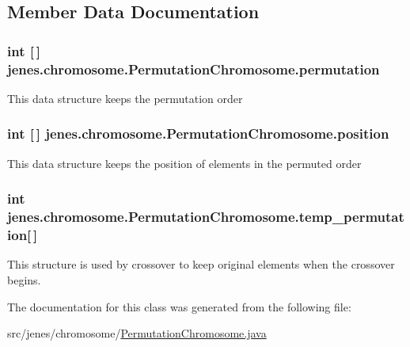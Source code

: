 \subsection{Member Data Documentation}
\hypertarget{classjenes_1_1chromosome_1_1_permutation_chromosome_a8b5701fbbb3cdfef29d346e0375260fc}{
\subsubsection[{permutation}]{\setlength{\rightskip}{0pt plus 5cm}int \mbox{[}$\,$\mbox{]} jenes.\-chromosome.\-Permutation\-Chromosome.\-permutation\hspace{0.3cm}{\ttfamily [protected]}}}\label{classjenes_1_1chromosome_1_1_permutation_chromosome_a8b5701fbbb3cdfef29d346e0375260fc}
This data structure keeps the permutation order \hypertarget{classjenes_1_1chromosome_1_1_permutation_chromosome_aeb2d393eb8a9cc106205e13fb88446cc}{
\subsubsection[{position}]{\setlength{\rightskip}{0pt plus 5cm}int \mbox{[}$\,$\mbox{]} jenes.\-chromosome.\-Permutation\-Chromosome.\-position\hspace{0.3cm}{\ttfamily [protected]}}}\label{classjenes_1_1chromosome_1_1_permutation_chromosome_aeb2d393eb8a9cc106205e13fb88446cc}
This data structure keeps the position of elements in the permuted order \hypertarget{classjenes_1_1chromosome_1_1_permutation_chromosome_a61c7a5da5ced308153f942ec265a912b}{
\subsubsection[{temp\-\_\-permutation}]{\setlength{\rightskip}{0pt plus 5cm}int jenes.\-chromosome.\-Permutation\-Chromosome.\-temp\-\_\-permutation\mbox{[}$\,$\mbox{]}\hspace{0.3cm}{\ttfamily [private]}}}\label{classjenes_1_1chromosome_1_1_permutation_chromosome_a61c7a5da5ced308153f942ec265a912b}
This structure is used by crossover to keep original elements when the crossover begins. 

The documentation for this class was generated from the following file\-:\begin{DoxyCompactItemize}
\item 
src/jenes/chromosome/\hyperlink{_permutation_chromosome_8java}{Permutation\-Chromosome.\-java}\end{DoxyCompactItemize}
